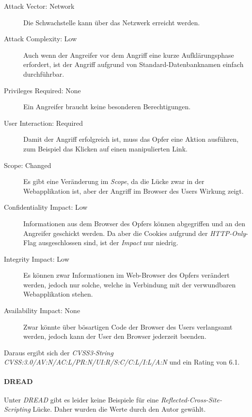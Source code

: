 	\begin{description}
		\item[Attack Vector: Network] Die Schwachstelle kann über das Netzwerk erreicht werden.
		\item[Attack Complexity: Low] Auch wenn der Angreifer vor dem Angriff eine kurze Aufklärungsphase erfordert, ist der Angriff aufgrund von Standard-Datenbanknamen einfach durchführbar.
		
		\item[Privileges Required: None] Ein Angreifer braucht keine besonderen Berechtigungen.
		
		\item[User Interaction: Required] Damit der Angriff erfolgreich ist, muss das Opfer eine Aktion ausführen, zum Beispiel das Klicken auf einen manipulierten Link.
		
		\item[Scope: Changed] Es gibt eine Veränderung im \textit{Scope}, da die Lücke zwar in der Webapplikation ist, aber der Angriff im Browser des Users Wirkung zeigt. 
		
		\item[Confidentiality Impact: Low] Informationen aus dem Browser des Opfers können abgegriffen und an den Angreifer geschickt werden. Da aber die Cookies aufgrund der \textit{HTTP-Only}-Flag ausgeschlossen sind, ist der \textit{Impact} nur niedrig.
		
		\item[Integrity Impact: Low] Es können zwar Informationen im Web-Browser des Opfers verändert werden, jedoch nur solche, welche in Verbindung mit der verwundbaren Webapplikation stehen.
		
		\item[Availability Impact: None] Zwar könnte über bösartigen Code der Browser des Users verlangsamt werden, jedoch kann der User den Browser jederzeit beenden.
	\end{description}	
	
	Daraus ergibt sich der \textit{CVSS3-String} \textit{CVSS:3.0/AV:N/AC:L/PR:N/UI:R/S:C/C:L/I:L/A:N} und ein Rating von 6.1.
	
	\paragraph{DREAD}
	Unter \textit{DREAD} gibt es leider keine Beispiele für eine \textit{Reflected-Cross-Site-Scripting} Lücke. Daher wurden die Werte durch den Autor gewählt.
	
